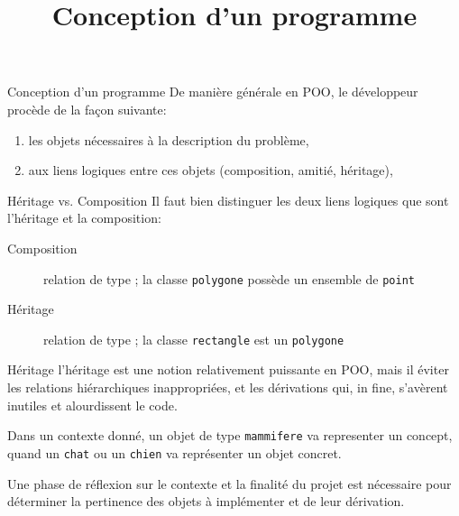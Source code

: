 \documentclass[c]{beamer}
\title{Conception d'un programme}
\begin{document}
\maketitle

\begin{frame}[label={sec:orgheadline1}]{Conception d'un programme}
De manière générale en POO, le développeur procède de la façon suivante:

\begin{enumerate}
\item {} les objets nécessaires à la description du problème,

\item {} aux liens logiques entre ces objets (composition, amitié,
héritage),
\end{enumerate}
\end{frame}

\begin{frame}[fragile,label={sec:orgheadline2}]{Héritage vs. Composition}
 Il faut bien distinguer les deux liens logiques que sont l'héritage et la
composition:

\begin{description}
\item[{Composition}] relation de type ; la classe \texttt{polygone} possède
un ensemble de \texttt{point}
\item[{Héritage}] relation de type ; la classe \texttt{rectangle} est un
\texttt{polygone}
\end{description}
\end{frame}

\begin{frame}[fragile,label={sec:orgheadline3}]{Héritage}
 l'héritage est une notion relativement puissante en POO, mais il 
 éviter les relations hiérarchiques inappropriées, et les dérivations qui, in fine,
 s'avèrent inutiles et alourdissent le code.

\vspace{+0.5cm}

Dans un contexte donné, un objet de type \texttt{mammifere} va representer un concept, quand un \texttt{chat} ou un \texttt{chien} va représenter un objet concret. 

\vspace{+0.5cm}



\vspace{0.25cm}

Une phase de réflexion sur le contexte et la finalité du projet est nécessaire pour déterminer la pertinence des objets à implémenter et de leur dérivation.
\end{frame}
\end{document}

